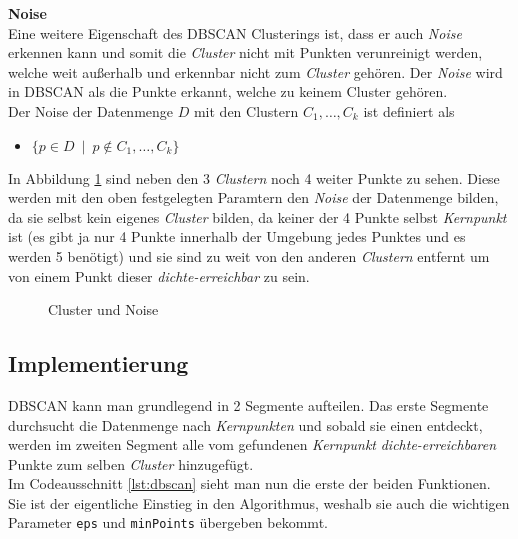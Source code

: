 \documentclass{lni}
\begin{document}
    
\textbf{Noise}\\
Eine weitere Eigenschaft des DBSCAN Clusterings ist, dass er auch \textit{Noise} erkennen kann und somit die \textit{Cluster} nicht mit Punkten verunreinigt werden, welche weit außerhalb und erkennbar nicht zum \textit{Cluster} gehören. Der \textit{Noise} wird in DBSCAN als die Punkte erkannt, welche zu keinem Cluster gehören.\\
Der Noise der Datenmenge $D$ mit den Clustern $C_1,\dots,C_k$ ist definiert als
\begin{itemize}
    \item $ \{ p \in D \enspace | \enspace p \notin C_1,\dots,C_k \} $
\end{itemize}
In Abbildung \ref{fig:3} sind neben den 3 \textit{Clustern} noch 4 weiter Punkte zu sehen. Diese werden mit den oben festgelegten Paramtern den \textit{Noise} der Datenmenge bilden, da sie selbst kein eigenes \textit{Cluster} bilden, da keiner der 4 Punkte selbst \textit{Kernpunkt} ist (es gibt ja nur 4 Punkte innerhalb der Umgebung jedes Punktes und es werden 5 benötigt) und sie sind zu weit von den anderen \textit{Clustern} entfernt um von einem Punkt dieser \textit{dichte-erreichbar} zu sein.


\begin{figure}[hb]
    \centering
    
    \caption{Cluster und Noise}
    \label{fig:3}
\end{figure}

%
%

\subsection{Implementierung}
\label{sec:impl}
DBSCAN kann man grundlegend in 2 Segmente aufteilen. Das erste Segmente durchsucht die Datenmenge nach \textit{Kernpunkten} und sobald sie einen entdeckt, werden im zweiten Segment alle vom gefundenen \textit{Kernpunkt} \textit{dichte-erreichbaren} Punkte zum selben \textit{Cluster} hinzugefügt.\\


Im Codeausschnitt \ref{lst:dbscan} sieht man nun die erste der beiden Funktionen. Sie ist der eigentliche Einstieg in den Algorithmus, weshalb sie auch die wichtigen Parameter \lstinline{eps} und \lstinline{minPoints} übergeben bekommt.\\
\end{document}
